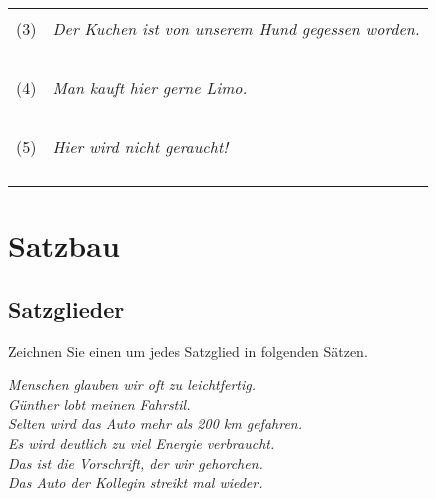 \documentclass[12pt,a4paper,twoside]{article}
\newcommand*{\mybox}[1]{\framebox{#1}}
\begin{document}
\newpage

\begin{center}
  \begin{tabular}[h]{cp{}}
    & \\
    (3) & \textit{Der Kuchen ist von unserem Hund gegessen worden.} \\
    & \\
    &\\\cline{2-2}
    & \\
    &\\\cline{2-2}
    & \\
    (4) & \textit{Man kauft hier gerne Limo.} \\
    & \\
    &\\\cline{2-2}
    & \\
    &\\\cline{2-2}
    & \\
    (5) & \textit{Hier wird nicht geraucht!} \\
    & \\
    &\\\cline{2-2}
    & \\
    &\\\cline{2-2}
  \end{tabular}
\end{center}


\section{Satzbau}

\subsection{Satzglieder}

Zeichnen Sie einen \mybox{Kasten} um jedes Satzglied in folgenden Sätzen.

\begin{exe}
  \setcounter{xnumi}{0}
  \ex \textit{Menschen glauben wir oft zu leichtfertig.}\\

  \ex \textit{Günther lobt meinen Fahrstil.}\\

  \ex \textit{Selten wird das Auto mehr als 200 km gefahren.}\\

  \ex \textit{Es wird deutlich zu viel Energie verbraucht.}\\

  \ex \textit{Das ist die Vorschrift, der wir gehorchen.}\\

  \ex \textit{Das Auto der Kollegin streikt mal wieder.}
\end{exe}
\end{document}
